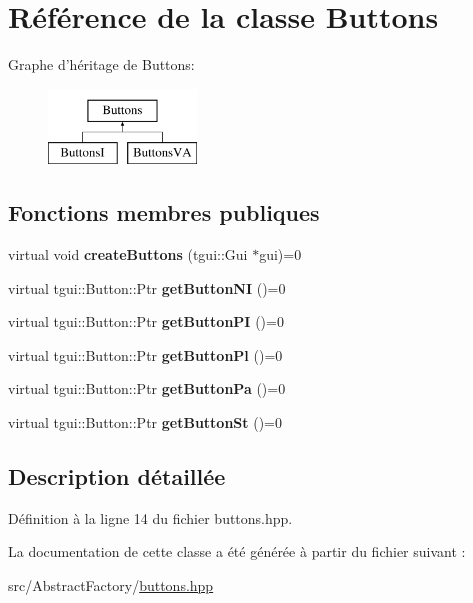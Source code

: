 \hypertarget{classButtons}{\section{Référence de la classe Buttons}
\label{classButtons}
}
Graphe d'héritage de Buttons\+:\begin{figure}[H]
\begin{center}
\leavevmode
\includegraphics[height=2.000000cm]{classButtons}
\end{center}
\end{figure}
\subsection*{Fonctions membres publiques}
\begin{DoxyCompactItemize}
\item 
\hypertarget{classButtons_a785133d78116a4455166af0419f8283c}{virtual void {\bfseries create\+Buttons} (tgui\+::\+Gui $\ast$gui)=0}\label{classButtons_a785133d78116a4455166af0419f8283c}

\item 
\hypertarget{classButtons_a12154e1ff630b800dd9d5193e97202a0}{virtual tgui\+::\+Button\+::\+Ptr {\bfseries get\+Button\+N\+I} ()=0}\label{classButtons_a12154e1ff630b800dd9d5193e97202a0}

\item 
\hypertarget{classButtons_a82e85c87c04ead2f4bfbe661787e8094}{virtual tgui\+::\+Button\+::\+Ptr {\bfseries get\+Button\+P\+I} ()=0}\label{classButtons_a82e85c87c04ead2f4bfbe661787e8094}

\item 
\hypertarget{classButtons_aea3bd52fcd2c6b41d71a02fb923be3c7}{virtual tgui\+::\+Button\+::\+Ptr {\bfseries get\+Button\+Pl} ()=0}\label{classButtons_aea3bd52fcd2c6b41d71a02fb923be3c7}

\item 
\hypertarget{classButtons_ab1fa18621507e31f3c6a66aaac91d065}{virtual tgui\+::\+Button\+::\+Ptr {\bfseries get\+Button\+Pa} ()=0}\label{classButtons_ab1fa18621507e31f3c6a66aaac91d065}

\item 
\hypertarget{classButtons_a2e03184bee5b70e8acb1f53c98632350}{virtual tgui\+::\+Button\+::\+Ptr {\bfseries get\+Button\+St} ()=0}\label{classButtons_a2e03184bee5b70e8acb1f53c98632350}

\end{DoxyCompactItemize}


\subsection{Description détaillée}


Définition à la ligne 14 du fichier buttons.\+hpp.



La documentation de cette classe a été générée à partir du fichier suivant \+:\begin{DoxyCompactItemize}
\item 
src/\+Abstract\+Factory/\hyperlink{buttons_8hpp}{buttons.\+hpp}\end{DoxyCompactItemize}
